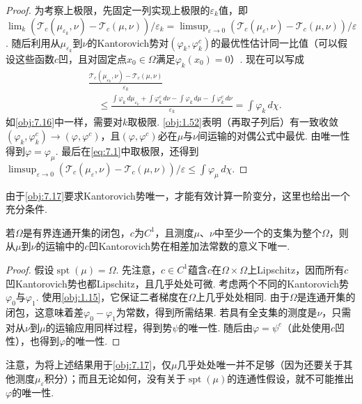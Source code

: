 \begin{proof}
为考察上极限，先固定一列实现上极限的$\varepsilon_k$值，即$\lim_k(\mathscr T_c(\mu_{\varepsilon_k},\nu)-\mathscr T_c(\mu,\nu))/\varepsilon_k=\limsup_{\varepsilon\to0}(\mathscr T_c(\mu_\varepsilon,\nu)-\mathscr T_c(\mu,\nu))/\varepsilon$. 随后利用从$\mu_{\varepsilon_k}$到$\nu$的Kantorovich势对$(\varphi_k,\varphi_k^c)$的最优性估计同一比值（可以假设这些函数$c$凹，且对固定点$x_0\in\Omega$满足$\varphi_k(x_0)=0$）. 现在可以写成
\begin{equation}\label{eq:7.1}
\begin{aligned}
 &\frac{\mathscr T_c(\mu_{\varepsilon_k},\nu)-\mathscr T_c(\mu,\nu)}{\varepsilon_k}\\
 &\quad\leq\frac{\int\varphi_k\,d\mu_{\varepsilon_k}+\int\varphi_k^c\,d\nu
                 -\int\varphi_k\,d\mu-\int\varphi_k^c\,d\nu}{\varepsilon_k}
 =\int\varphi_k\,d\chi.
\end{aligned}
\end{equation}
如\autoref{obj:7.16}中一样，需要对$k$取极限. \autoref{obj:1.52}表明（再取子列后）有一致收敛$(\varphi_k,\varphi_k^c)\to(\varphi,\varphi^c)$，且$(\varphi,\varphi^c)$必在$\mu$与$\nu$间运输的对偶公式中最优. 由唯一性得到$\varphi=\varphi_\mu$. 最后在\eqref{eq:7.1}中取极限，还得到$\limsup_{\varepsilon\to0}(\mathscr T_c(\mu_\varepsilon,\nu)-\mathscr T_c(\mu,\nu))/\varepsilon\leq\int\varphi_\mu\,d\chi$.
\end{proof}
由于\autoref{obj:7.17}要求Kantorovich势唯一，才能有效计算一阶变分，这里也给出一个充分条件.
\begin{proposition}\label{obj:7.18}
若$\Omega$是有界连通开集的闭包，$c$为$C^1$，且测度$\mu$、$\nu$中至少一个的支集为整个$\Omega$，则从$\mu$到$\nu$的运输中的$c$凹Kantorovich势在相差加法常数的意义下唯一.
\end{proposition}
\begin{proof}
假设$\operatorname{spt}(\mu)=\Omega$. 先注意，$c\in C^1$蕴含$c$在$\Omega\times\Omega$上Lipschitz，因而所有$c$凹Kantorovich势也都Lipschitz，且几乎处处可微. 考虑两个不同的Kantorovich势$\varphi_0$与$\varphi_1$. 使用\autoref{obj:1.15}，它保证二者梯度在$\Omega$上几乎处处相同. 由于$\Omega$是连通开集的闭包，这意味着差$\varphi_0-\varphi_1$为常数，得到所需结果. 若具有全支集的测度是$\nu$，只需对从$\nu$到$\mu$的运输应用同样过程，得到势$\psi$的唯一性. 随后由$\varphi=\psi^c$（此处使用$c$凹性），也得到$\varphi$的唯一性.
\end{proof}
注意，为将上述结果用于\autoref{obj:7.17}，仅$\mu$几乎处处唯一并不足够（因为还要关于其他测度$\mu_\varepsilon$积分）；而且无论如何，没有关于$\operatorname{spt}(\mu)$的连通性假设，就不可能推出$\varphi$的唯一性.

